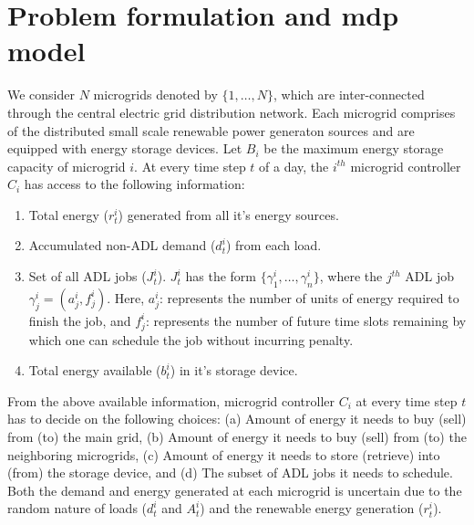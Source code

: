 \section{Problem formulation and mdp model} \label{sec:model}
We consider $N$ microgrids denoted by $\{1,\ldots,N\}$, which are inter-connected through the central electric grid distribution network. Each microgrid comprises of the distributed small scale renewable power generaton sources and are equipped with energy storage devices. Let $B_i$ be the maximum energy storage capacity of microgrid $i$. At every time step $t$ of a day, the $i^{th}$ microgrid controller $C_i$ has access to the following information:
\begin{enumerate}[label=(\alph*)]
\item Total energy ($r_t^i$) generated from all it's energy sources.
\item Accumulated non-ADL demand ($d_t^i$) from each load. 
\item Set of all ADL jobs ($J_{t}^{i}$). $J_{t}^{i}$ has the form $\{\gamma_{1}^{i},\ldots,\gamma_{n}^{i}\}$, where the $j^{th}$ ADL job $\gamma_{j}^{i} = (a_{j}^{i}, f_{j}^{i})$. Here, $a_{j}^{i}$: represents the number of units of energy required to finish the job, and  $f_{j}^{i}$: represents the number of future time slots remaining by which one can schedule the job without incurring penalty.
\item  Total energy available ($b_{t}^{i}$) in it's storage device.
\end{enumerate} 
From the above available information, microgrid controller  $C_i$ at every time step $t$ has to decide on the following choices: (a)  Amount of energy it needs to buy (sell) from (to) the main grid, (b) Amount of energy it needs to buy (sell) from (to) the neighboring microgrids,
(c) Amount of energy it needs to store (retrieve) into (from) the storage device, and (d) The subset of ADL jobs it needs to schedule. Both the demand and energy generated at each microgrid is uncertain due to the random nature of loads ($d_t^i$ and $A_t^i$) and the renewable energy generation ($r_t^i$). 

